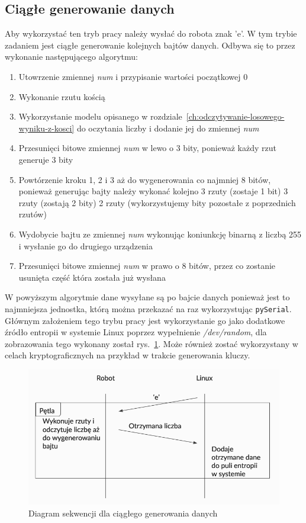 \subsection{Ciągłe generowanie danych}
Aby wykorzystać ten tryb pracy należy wysłać do robota znak 'e'.
W tym trybie zadaniem jest ciągłe generowanie kolejnych bajtów danych.
Odbywa się to przez wykonanie następującego algorytmu:
\begin{enumerate}
    \item Utowrzenie zmiennej \textit{num} i przypisanie wartości początkowej 0
    \item Wykonanie rzutu kością
    \item Wykorzystanie modelu opisanego w rozdziale~\ref{ch:odczytywanie-losowego-wyniku-z-kosci} do oczytania liczby i dodanie jej do zmiennej \textit{num}
    \item Przesunięci bitowe zmiennej \textit{num} w lewo o 3 bity, ponieważ każdy rzut generuje 3 bity 
    \item Powtórzenie kroku 1, 2 i 3 aż do wygenerowania co najmniej 8 bitów, ponieważ generując bajty należy wykonać 
    kolejno 3 rzuty (zostaje 1 bit) 3 rzuty (zostają 2 bity) 2 rzuty (wykorzystujemy bity pozostałe z poprzednich rzutów)
    \item Wydobycie bajtu ze zmiennej \textit{num} wykonując koniunkcję binarną z liczbą 255 i wysłanie go do drugiego urządzenia
    \item Przesunięci bitowe zmiennej \textit{num} w prawo o 8 bitów, przez co zostanie usunięta część która została już wysłana
\end{enumerate}

W powyższym algorytmie dane wysyłane są po bajcie danych ponieważ jest to najmniejsza jednostka, 
którą można przekazać na raz wykorzystując \texttt{pySerial}.
Głównym założeniem tego trybu pracy jest wykorzystanie go jako dodatkowe źródło entropii w systemie 
Linux poprzez wypełnienie \textit{/dev/random}, dla zobrazowania tego wykonany został rys.~\ref{fig:interface_a}. Może również zostać wykorzystany w celach 
kryptograficznych na przykład w trakcie generowania kluczy.

\begin{figure}[H]
    \centering
    \includegraphics[width=0.5\linewidth]{chapters/05-Przetwarzanie Wyniku/figures/InterfaceA}
    \caption{Diagram sekwencji dla ciągłego generowania danych}
    \label{fig:interface_a}
\end{figure}

